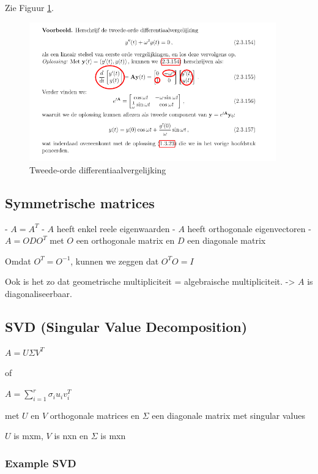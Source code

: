 \documentclass[a4paper]{article}
\begin{document}
Zie Figuur \ref{fig:diff2}.

\begin{figure}[htbp!]
	\begin{center}
		\includegraphics[width=0.95\textwidth]{./images/something.png}
	\end{center}
	\caption{Tweede-orde differentiaalvergelijking}
	\label{fig:diff2}
\end{figure}

\subsection{Symmetrische matrices}

- $A = A^T$
- $A$ heeft enkel reele eigenwaarden
- $A$ heeft orthogonale eigenvectoren
- $A = ODO^T$ met $O$ een orthogonale matrix en $D$ een diagonale matrix

Omdat $O^T = O^{-1}$, kunnen we zeggen dat $O^T O = I$

Ook is het zo dat geometrische multipliciteit = algebraische multipliciteit. -> $A$ is diagonaliseerbaar.

\subsection{SVD (Singular Value Decomposition)}

$A = U \Sigma V^T$

of

$A = \sum_{i=1}^{r} \sigma_i u_i v_i^T$


met $U$ en $V$ orthogonale matrices en $\Sigma$ een diagonale matrix met singular values

$U$ is mxm, $V$ is nxn en $\Sigma$ is mxn


\subsubsection{Example SVD}
\end{document}
